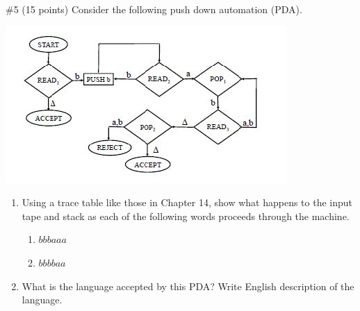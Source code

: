 \begin{problem}{\#5 (15 points)}
    Consider the following push down automation (PDA).
    \begin{center}
        \includegraphics[width=\linewidth]{figures/question5.jpg}
    \end{center}
    \begin{enumerate}[label=\alph*)]
        \item Using a trace table like those in Chapter 14, show what happens to the input tape and stack as each of the following words proceeds through the machine.
        \begin{enumerate}[label=\arabic*)]
            \item $bbbaaa$
            \item $bbbbaa$
        \end{enumerate}
        \item What is the language accepted by this PDA?
        Write English description of the language.
    \end{enumerate}
\end{problem}

